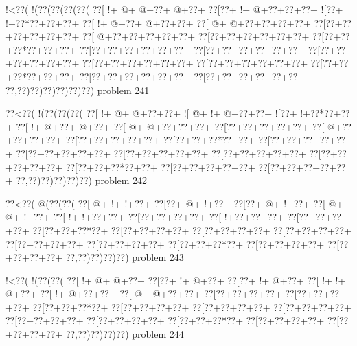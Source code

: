 \vbox{\vbox{\goo
\- !<\0??(\- !(\0??(\0??(\0??(\0??(
\0??[\- !+\- @+\- @+\0??+\- @+\0??+
\0??[\0??+\- !+\- @+\0??+\0??+\0??+
\- ![\0??+\- !+\0??*\0??+\0??+\0??+
\0??[\- !+\- @+\0??+\- @+\0??+\0??+
\0??[\- @+\- @+\0??+\0??+\0??+\0??+
\0??[\0??+\0??+\0??+\0??+\0??+\0??+
\0??[\- @+\0??+\0??+\0??+\0??+\0??+
\0??[\0??+\0??+\0??+\0??+\0??+\0??+
\0??[\0??+\0??+\0??*\0??+\0??+\0??+
\0??[\0??+\0??+\0??+\0??+\0??+\0??+
\0??[\0??+\0??+\0??+\0??+\0??+\0??+
\0??[\0??+\0??+\0??+\0??+\0??+\0??+
\0??[\0??+\0??+\0??+\0??+\0??+\0??+
\0??[\0??+\0??+\0??+\0??+\0??+\0??+
\0??[\0??+\0??+\0??*\0??+\0??+\0??+
\0??[\0??+\0??+\0??+\0??+\0??+\0??+
\0??[\0??+\0??+\0??+\0??+\0??+\0??+
\0??,\0??)\0??)\0??)\0??)\0??)\0??)
}
\hfil problem 241\hfil\break
}

\vbox{\vbox{\goo
\0??<\0??(\- !(\0??(\0??(\0??(
\0??[\- !+\- @+\- @+\0??+\0??+
\- ![\- @+\- !+\- @+\0??+\0??+
\- ![\0??+\- !+\0??*\0??+\0??+
\0??[\- !+\- @+\0??+\- @+\0??+
\0??[\- @+\- @+\0??+\0??+\0??+
\0??[\0??+\0??+\0??+\0??+\0??+
\0??[\- @+\0??+\0??+\0??+\0??+
\0??[\0??+\0??+\0??+\0??+\0??+
\0??[\0??+\0??+\0??*\0??+\0??+
\0??[\0??+\0??+\0??+\0??+\0??+
\0??[\0??+\0??+\0??+\0??+\0??+
\0??[\0??+\0??+\0??+\0??+\0??+
\0??[\0??+\0??+\0??+\0??+\0??+
\0??[\0??+\0??+\0??+\0??+\0??+
\0??[\0??+\0??+\0??*\0??+\0??+
\0??[\0??+\0??+\0??+\0??+\0??+
\0??[\0??+\0??+\0??+\0??+\0??+
\0??,\0??)\0??)\0??)\0??)\0??)
}
\hfil problem 242\hfil\break
}

\vbox{\vbox{\goo
\0??<\0??(\- @(\0??(\0??(
\0??[\- @+\- !+\- !+\0??+
\0??[\0??+\- @+\- !+\0??+
\0??[\0??+\- @+\- !+\0??+
\0??[\- @+\- @+\- !+\0??+
\0??[\- !+\- !+\0??+\0??+
\0??[\0??+\0??+\0??+\0??+
\0??[\- !+\0??+\0??+\0??+
\0??[\0??+\0??+\0??+\0??+
\0??[\0??+\0??+\0??*\0??+
\0??[\0??+\0??+\0??+\0??+
\0??[\0??+\0??+\0??+\0??+
\0??[\0??+\0??+\0??+\0??+
\0??[\0??+\0??+\0??+\0??+
\0??[\0??+\0??+\0??+\0??+
\0??[\0??+\0??+\0??*\0??+
\0??[\0??+\0??+\0??+\0??+
\0??[\0??+\0??+\0??+\0??+
\0??,\0??)\0??)\0??)\0??)
}
\hfil problem 243\hfil\break
}

\vbox{\vbox{\goo
\- !<\0??(\- !(\0??(\0??(
\0??[\- !+\- @+\- @+\0??+
\0??[\0??+\- !+\- @+\0??+
\0??[\0??+\- !+\- @+\0??+
\0??[\- !+\- !+\- @+\0??+
\0??[\- !+\- @+\0??+\0??+
\0??[\- @+\- @+\0??+\0??+
\0??[\0??+\0??+\0??+\0??+
\0??[\0??+\0??+\0??+\0??+
\0??[\0??+\0??+\0??*\0??+
\0??[\0??+\0??+\0??+\0??+
\0??[\0??+\0??+\0??+\0??+
\0??[\0??+\0??+\0??+\0??+
\0??[\0??+\0??+\0??+\0??+
\0??[\0??+\0??+\0??+\0??+
\0??[\0??+\0??+\0??*\0??+
\0??[\0??+\0??+\0??+\0??+
\0??[\0??+\0??+\0??+\0??+
\0??,\0??)\0??)\0??)\0??)
}
\hfil problem 244\hfil\break
}

